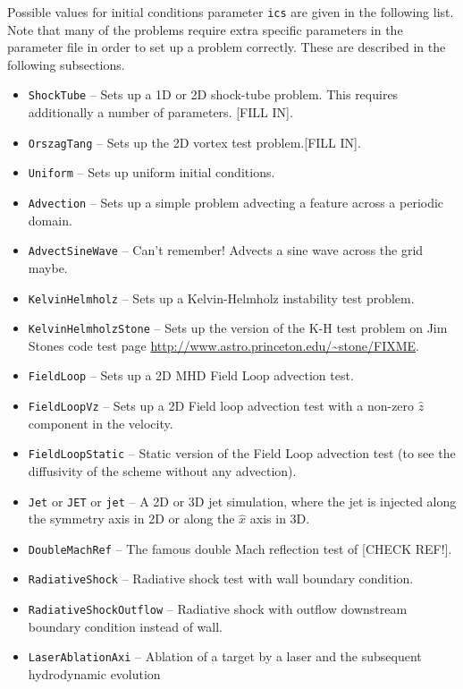 \documentclass[a4paper,11pt]{report}
\begin{document}
Possible values for initial conditions parameter \verb|ics| are given in the following list.  Note that many of the problems require extra specific parameters in the parameter file in order to set up a problem correctly.  These are described in the following subsections.
\begin{itemize}
  \item \verb|ShockTube| -- Sets up a 1D or 2D shock-tube problem.
  This requires additionally a number of parameters. [FILL IN].
  \item \verb|OrszagTang| -- Sets up the 2D \citet{OrsTan79} vortex test problem.[FILL IN].
  \item \verb|Uniform| -- Sets up uniform initial conditions.
  \item \verb|Advection| -- Sets up a simple problem advecting a feature across a periodic domain.
  \item \verb|AdvectSineWave| -- Can't remember! Advects a sine wave across the grid maybe.
  \item \verb|KelvinHelmholz| -- Sets up a Kelvin-Helmholz instability test problem.
  \item \verb|KelvinHelmholzStone| -- Sets up the version of the K-H test problem on Jim Stones code test page \url{http://www.astro.princeton.edu/~stone/FIXME}.
  \item \verb|FieldLoop| -- Sets up a 2D MHD Field Loop advection test.
  \item \verb|FieldLoopVz| -- Sets up a 2D Field loop advection test with a non-zero $\hat{z}$ component in the velocity.
  \item \verb|FieldLoopStatic| -- Static version of the Field Loop advection test (to see the diffusivity of the scheme without any advection).
  \item \verb|Jet| or \verb|JET| or \verb|jet| -- A 2D or 3D jet simulation, where the jet is injected along the symmetry axis in 2D or along the $\hat{x}$ axis in 3D.
  \item \verb|DoubleMachRef| -- The famous double Mach reflection test of \citet{ColWoo84} [CHECK REF!].
  \item \verb|RadiativeShock| -- Radiative shock test \citep[e.g.][]{InnGidFal87b} with wall boundary condition.
  \item \verb|RadiativeShockOutflow| -- Radiative shock with outflow downstream boundary condition instead of wall.
  \item \verb|LaserAblationAxi| -- Ablation of a target by a laser and the subsequent hydrodynamic evolution

\end{itemize}
\end{document}
